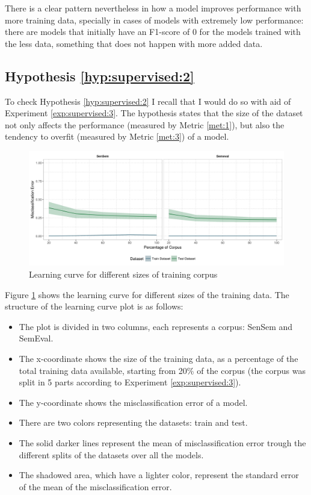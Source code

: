 There is a clear pattern nevertheless in how a model improves performance with
more training data, specially in cases of models with extremely low
performance: there are models that initially have an F1-score of 0 for the
models trained with the less data, something that does not happen with more
added data.

\subsection{Hypothesis \ref{hyp:supervised:2}}\label{sec:supervised:hyp:2}

To check Hypothesis \ref{hyp:supervised:2} I recall that I would do so
with aid of Experiment \ref{exp:supervised:3}. The hypothesis states
that the size of the dataset not only affects the performance (measured by
Metric \ref{met:1}), but also the tendency to overfit (measured
by Metric \ref{met:3}) of a model.

\begin{figure}[ht]
	\includegraphics[width=\textwidth]{plots/supervised/learning_curve_scores}
  \caption{Learning curve for different sizes of training corpus}
  \label{fig:supervised:learning_curve}
\end{figure}

Figure \ref{fig:supervised:learning_curve} shows the learning curve for
different sizes of the training data. The structure of the learning curve plot
is as follows:

\begin{itemize}
  \item The plot is divided in two columns, each represents a corpus: SenSem
    and SemEval.
  \item The x-coordinate shows the size of the training data, as a percentage
    of the total training data available, starting from 20\% of the corpus (the
    corpus was split in 5 parts according to Experiment
    \ref{exp:supervised:3}).
  \item The y-coordinate shows the misclassification error of a model.
  \item There are two colors representing the datasets: train and test.
  \item The solid darker lines represent the mean of misclassification error
    trough the different splits of the datasets over all the models.
  \item The shadowed area, which have a lighter color, represent the standard
    error of the mean of the misclassification error.
\end{itemize}

